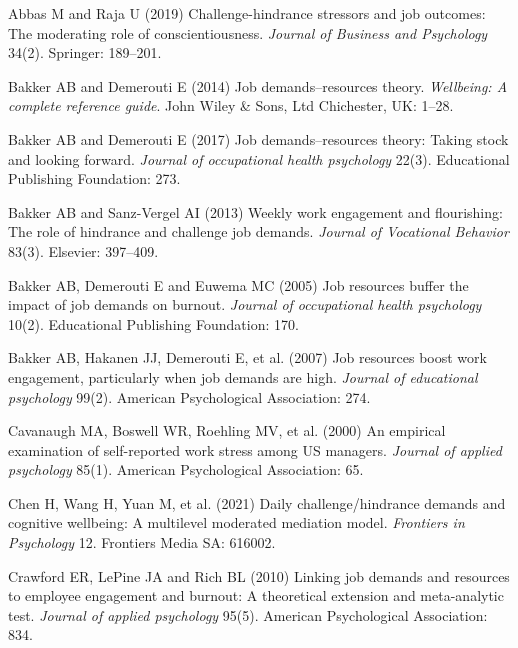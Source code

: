 \documentclass[
  man]{apa7}
\newlength{\cslhangindent}
\newlength{\cslentryspacingunit} %
\newenvironment{CSLReferences}[2] %
 {%
  \setlength{\parindent}{0pt}
  \ifodd #1
  \let\oldpar\par
  \def\par{\hangindent=\cslhangindent\oldpar}
  \fi
  \setlength{\parskip}{#2\cslentryspacingunit}
 }%
 {}
\begin{document}
\hypertarget{refs}{}
\begin{CSLReferences}{1}{0}
\leavevmode{}%
Abbas M and Raja U (2019) Challenge-hindrance stressors and job outcomes: The moderating role of conscientiousness. \emph{Journal of Business and Psychology} 34(2). Springer: 189--201.

\leavevmode{}%
Bakker AB and Demerouti E (2014) Job demands--resources theory. \emph{Wellbeing: A complete reference guide}. John Wiley \& Sons, Ltd Chichester, UK: 1--28.

\leavevmode{}%
Bakker AB and Demerouti E (2017) Job demands--resources theory: Taking stock and looking forward. \emph{Journal of occupational health psychology} 22(3). Educational Publishing Foundation: 273.

\leavevmode{}%
Bakker AB and Sanz-Vergel AI (2013) Weekly work engagement and flourishing: The role of hindrance and challenge job demands. \emph{Journal of Vocational Behavior} 83(3). Elsevier: 397--409.

\leavevmode{}%
Bakker AB, Demerouti E and Euwema MC (2005) Job resources buffer the impact of job demands on burnout. \emph{Journal of occupational health psychology} 10(2). Educational Publishing Foundation: 170.

\leavevmode{}%
Bakker AB, Hakanen JJ, Demerouti E, et al. (2007) Job resources boost work engagement, particularly when job demands are high. \emph{Journal of educational psychology} 99(2). American Psychological Association: 274.

\leavevmode{}%
Cavanaugh MA, Boswell WR, Roehling MV, et al. (2000) An empirical examination of self-reported work stress among US managers. \emph{Journal of applied psychology} 85(1). American Psychological Association: 65.

\leavevmode{}%
Chen H, Wang H, Yuan M, et al. (2021) Daily challenge/hindrance demands and cognitive wellbeing: A multilevel moderated mediation model. \emph{Frontiers in Psychology} 12. Frontiers Media SA: 616002.

\leavevmode{}%
Crawford ER, LePine JA and Rich BL (2010) Linking job demands and resources to employee engagement and burnout: A theoretical extension and meta-analytic test. \emph{Journal of applied psychology} 95(5). American Psychological Association: 834.


\end{CSLReferences}
\end{document}
